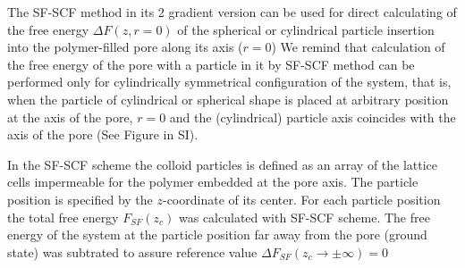 \documentclass[12pt, a4paper]{article}
\newcommand\todo[1]{\textcolor{red}{#1}}
\begin{document}


The SF-SCF method in its 2 gradient version can be used for direct calculating of the free energy $\Delta F(z,r=0)$ of the spherical or cylindrical particle insertion into the
polymer-filled pore along its axis ($r=0$)
We remind that calculation of the free energy of the pore with a particle in it by SF-SCF method  can be performed only 
for cylindrically symmetrical configuration of the system, that is, when the particle of cylindrical or spherical shape is placed at arbitrary position at the axis of the pore, $r=0$ and
the (cylindrical) particle axis coincides with the axis of the pore (See Figure in SI).
  

In the SF-SCF scheme the colloid particles is defined as an array of the lattice cells impermeable for the polymer embedded at the pore axis.
The particle position is specified by the $z$-coordinate of its center. 
For each particle position the total free energy $F_{SF}(z_c)$ was calculated with SF-SCF scheme. 
The free energy of the system at the particle position far away from the pore (ground state) was subtrated to 
assure reference value $\Delta F_{SF}(z_c \rightarrow \pm \infty) = 0$
\end{document}
